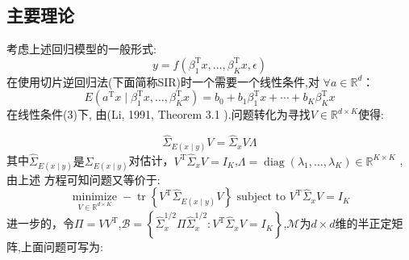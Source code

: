 \documentclass[lang=cn,11pt,a4paper]{elegantpaper}
\newcommand{\R}[0]{\mathbb{R}}
\newcommand{\M}[0]{\mathcal{M}}
\begin{document}
\subsection{主要理论}
考虑上述回归模型的一般形式:
\begin{equation}
y=f\left(\beta_{1}^{\mathrm{T}} x, \ldots, \beta_{K}^{\mathrm{T}} x, \epsilon\right)
\end{equation}
在使用切片逆回归法(下面简称SIR)时一个需要一个线性条件,对 $ \forall a \in \R^d$：
\begin{equation}
    E\left(a^{\mathrm{T}} x \mid \beta_{1}^{\mathrm{T}} x, \ldots, \beta_{K}^{\mathrm{T}} x\right)=b_{0}+b_{1} \beta_{1}^{\mathrm{T}} x+\cdots+b_{K} \beta_{K}^{\mathrm{T}} x
\end{equation}
在线性条件(3)下, 由(Li, 1991\cite{1991_paper}, Theorem 3.1 ).问题转化为寻找$ V \in \R^{d \times K}$使得:

\begin{equation}
    \hat{\Sigma}_{E(x \mid y)} V=\hat{\Sigma}_{x} V \Lambda
\end{equation}
其中$\hat{\Sigma}_{E(x \mid y)} \text{是} {\Sigma}_{E(x \mid y)} $对估计，$V^{\mathrm{T}} \hat{\Sigma}_{x} V= I_K$,$\Lambda=\operatorname{diag}\left(\lambda_{1}, \ldots, \lambda_{K}\right) \in \mathbb{R}^{K \times K}$ ,由上述 方程可知问题又等价于:
\begin{equation}
    \underset{V \in \mathbb{R}^{d \times K}}{\operatorname{minimize}}-\operatorname{tr}\left\{V^{\mathrm{T}} \hat{\Sigma}_{E(x \mid y)} V\right\} \text { subject to } V^{\mathrm{T}} \hat{\Sigma}_{x} V=I_{K}
\end{equation}
进一步的，令$\Pi=V V^{\mathrm{T}}$,$\mathcal{B}=\left\{\hat{\Sigma}_{x}^{1 / 2} \Pi \hat{\Sigma}_{x}^{1 / 2}: V^{\mathrm{T}} \hat{\Sigma}_{x} V=I_{K}\right\}$,$ \M$为$ d \times d$维的半正定矩阵,上面问题可写为:
\end{document}
